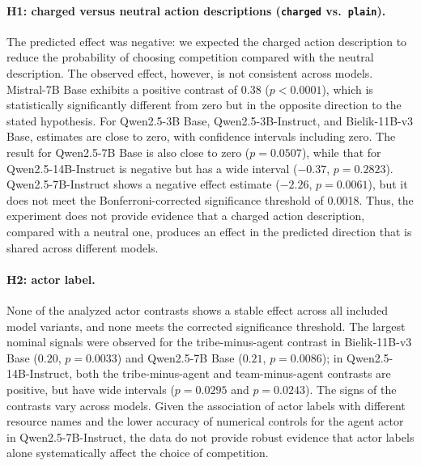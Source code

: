 \documentclass[11pt]{article}
\begin{document}
\paragraph{H1: charged versus neutral action descriptions (\texttt{charged} vs.\ \texttt{plain}).}
The predicted effect was negative: we expected the charged action description to reduce the probability of choosing competition compared with the neutral description. The observed effect, however, is not consistent across models. Mistral-7B Base exhibits a positive contrast of 0.38 ($p<0.0001$), which is statistically significantly different from zero but in the opposite direction to the stated hypothesis. For Qwen2.5-3B Base, Qwen2.5-3B-Instruct, and Bielik-11B-v3 Base, estimates are close to zero, with confidence intervals including zero. The result for Qwen2.5-7B Base is also close to zero ($p=0.0507$), while that for Qwen2.5-14B-Instruct is negative but has a wide interval ($-0.37$, $p=0.2823$). Qwen2.5-7B-Instruct shows a negative effect estimate ($-2.26$, $p=0.0061$), but it does not meet the Bonferroni-corrected significance threshold of 0.0018. Thus, the experiment does not provide evidence that a charged action description, compared with a neutral one, produces an effect in the predicted direction that is shared across different models.

\paragraph{H2: actor label.}
None of the analyzed actor contrasts shows a stable effect across all included model variants, and none meets the corrected significance threshold. The largest nominal signals were observed for the tribe-minus-agent contrast in Bielik-11B-v3 Base ($0.20$, $p=0.0033$) and Qwen2.5-7B Base ($0.21$, $p=0.0086$); in Qwen2.5-14B-Instruct, both the tribe-minus-agent and team-minus-agent contrasts are positive, but have wide intervals ($p=0.0295$ and $p=0.0243$). The signs of the contrasts vary across models. Given the association of actor labels with different resource names and the lower accuracy of numerical controls for the agent actor in Qwen2.5-7B-Instruct, the data do not provide robust evidence that actor labels alone systematically affect the choice of competition.
\end{document}
